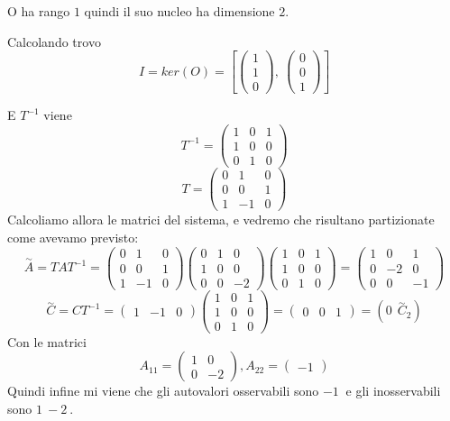 \documentclass{article}
\begin{document}
O ha rango $ 1 $ quindi il suo nucleo ha dimensione $ 2 $.

Calcolando trovo \[ 
I = ker(O) = \left[ \left(\begin{matrix}1\\1\\0\end{matrix}\right), \  \left(\begin{matrix}0\\0\\1\end{matrix}\right)\right]\]

E $T^{-1}$ viene \[ 
T^{-1} = \left(\begin{matrix}1 & 0 & 1\\1 & 0 & 0\\0 & 1 & 0\end{matrix}\right) \]
\[ 
T = \left(\begin{matrix}0 & 1 & 0\\0 & 0 & 1\\1 & -1 & 0\end{matrix}\right) \]Calcoliamo allora le matrici del sistema, e vedremo che risultano partizionate come avevamo previsto:
\[ 
\overset{\sim}{A} = T A  T^{-1} = \left(\begin{matrix}0 & 1 & 0\\0 & 0 & 1\\1 & -1 & 0\end{matrix}\right)\left(\begin{matrix}0 & 1 & 0\\1 & 0 & 0\\0 & 0 & -2\end{matrix}\right)\left(\begin{matrix}1 & 0 & 1\\1 & 0 & 0\\0 & 1 & 0\end{matrix}\right) = \left(\begin{matrix}1 & 0 & 1\\0 & -2 & 0\\0 & 0 & -1\end{matrix}\right) \]
\[ 
\overset{\sim}{C} = CT^{-1} = \left(\begin{matrix}1 & -1 & 0\end{matrix}\right)\left(\begin{matrix}1 & 0 & 1\\1 & 0 & 0\\0 & 1 & 0\end{matrix}\right) = \left(\begin{matrix}0 & 0 & 1\end{matrix}\right) = ( 0\ \ \overset{\sim}{C}_2) \]
Con le matrici \[ A_{11} = \left(\begin{matrix}1 & 0\\0 & -2\end{matrix}\right) , A_{22} = \left(\begin{matrix}-1\end{matrix}\right) \]Quindi infine mi viene che gli autovalori osservabili sono $ -1\  $ e gli inosservabili sono $ 1\ -2\  $.
\end{document}
